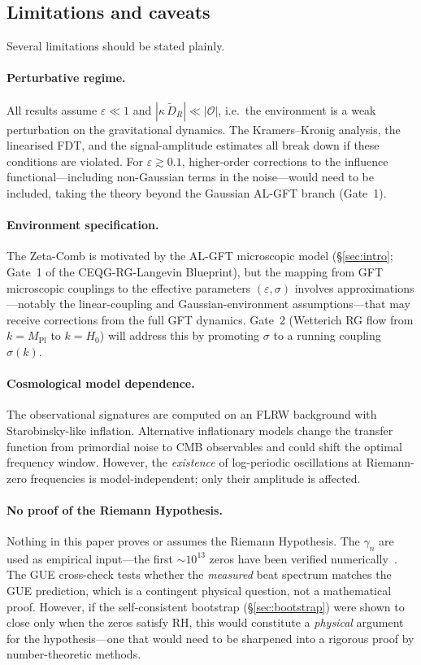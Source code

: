 \documentclass[12pt,a4paper]{article}
\begin{document}
\subsection{Limitations and caveats}
\label{subsec:limitations}

Several limitations should be stated plainly.

\paragraph{Perturbative regime.}
All results assume $\varepsilon \ll 1$ and
$|\kappa\,\widetilde{D}_{R}| \ll |\mathcal{O}|$,
i.e.\ the environment is a weak perturbation on the
gravitational dynamics.
The Kramers--Kronig analysis, the linearised FDT, and
the signal-amplitude estimates all break down if these
conditions are violated.
For $\varepsilon \gtrsim 0.1$, higher-order corrections
to the influence functional---including non-Gaussian
terms in the noise---would need to be included, taking
the theory beyond the Gaussian AL-GFT branch (Gate~1).

\paragraph{Environment specification.}
The Zeta-Comb is motivated by the AL-GFT microscopic model
(\S\ref{sec:intro}; Gate~1 of the CEQG-RG-Langevin
Blueprint), but the mapping from GFT microscopic
couplings to the effective parameters
$(\varepsilon,\sigma)$ involves approximations---notably
the linear-coupling and Gaussian-environment
assumptions---that may receive corrections from the
full GFT dynamics.
Gate~2 (Wetterich RG flow from $k = M_{\mathrm{Pl}}$
to $k = H_{0}$) will address this by promoting
$\sigma$ to a running coupling $\sigma(k)$.

\paragraph{Cosmological model dependence.}
The observational signatures are computed on an FLRW
background with Starobinsky-like inflation.
Alternative inflationary models change the transfer
function from primordial noise to CMB observables and
could shift the optimal frequency window.
However, the \emph{existence} of log-periodic oscillations
at Riemann-zero frequencies is model-independent; only
their amplitude is affected.

\paragraph{No proof of the Riemann Hypothesis.}
Nothing in this paper proves or assumes the Riemann
Hypothesis.
The $\gamma_{n}$ are used as empirical input---the
first $\sim 10^{13}$ zeros have been verified
numerically~\cite{Platt2021,Odlyzko1987}.
The GUE cross-check tests whether the \emph{measured}
beat spectrum matches the GUE prediction, which is a
contingent physical question, not a mathematical proof.
However, if the self-consistent bootstrap
(\S\ref{sec:bootstrap}) were shown to close only when
the zeros satisfy RH, this would constitute a
\emph{physical} argument for the hypothesis---one that
would need to be sharpened into a rigorous proof by
number-theoretic methods.
\end{document}
